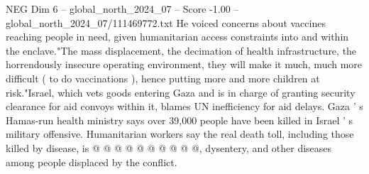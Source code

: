 \begin{textsample}{NEG Dim 6 – global\_north\_2024\_07 – Score -1.00 – global\_north\_2024\_07/111469772.txt}
He voiced concerns about vaccines reaching people in need, given humanitarian access constraints into and within the enclave."The mass displacement, the decimation of health infrastructure, the horrendously insecure operating environment, they will make it much, much more difficult ( to do vaccinations ), hence putting more and more children at risk."Israel, which vets goods entering Gaza and is in charge of granting security clearance for aid convoys within it, blames UN inefficiency for aid delays.
Gaza ' s Hamas-run health ministry says over 39,000 people have been killed in Israel ' s military offensive.
Humanitarian workers say the real death toll, including those killed by disease, is @ @ @ @ @ @ @ @ @ @, dysentery, and other diseases among people displaced by the conflict.

\end{textsample}
